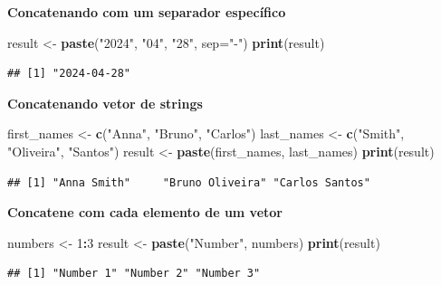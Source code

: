 \documentclass[
]{book}
\newenvironment{Shaded}{\begin{snugshade}}{\end{snugshade}}
\newcommand{\AttributeTok}[1]{\textcolor[rgb]{0.13,0.29,0.53}{#1}}
\newcommand{\DecValTok}[1]{\textcolor[rgb]{0.00,0.00,0.81}{#1}}
\newcommand{\FunctionTok}[1]{\textcolor[rgb]{0.13,0.29,0.53}{\textbf{#1}}}
\newcommand{\NormalTok}[1]{#1}
\newcommand{\OtherTok}[1]{\textcolor[rgb]{0.56,0.35,0.01}{#1}}
\newcommand{\SpecialCharTok}[1]{\textcolor[rgb]{0.81,0.36,0.00}{\textbf{#1}}}
\newcommand{\StringTok}[1]{\textcolor[rgb]{0.31,0.60,0.02}{#1}}
\begin{document}
\textbf{Concatenando com um separador específico}

\begin{Shaded}
\begin{Highlighting}[]
\NormalTok{result }\OtherTok{\textless{}{-}} \FunctionTok{paste}\NormalTok{(}\StringTok{"2024"}\NormalTok{, }\StringTok{"04"}\NormalTok{, }\StringTok{"28"}\NormalTok{, }\AttributeTok{sep=}\StringTok{"{-}"}\NormalTok{)}
\FunctionTok{print}\NormalTok{(result)}
\end{Highlighting}
\end{Shaded}

\begin{verbatim}
## [1] "2024-04-28"
\end{verbatim}

\textbf{Concatenando vetor de strings}

\begin{Shaded}
\begin{Highlighting}[]
\NormalTok{first\_names }\OtherTok{\textless{}{-}} \FunctionTok{c}\NormalTok{(}\StringTok{"Anna"}\NormalTok{, }\StringTok{"Bruno"}\NormalTok{, }\StringTok{"Carlos"}\NormalTok{)}
\NormalTok{last\_names }\OtherTok{\textless{}{-}} \FunctionTok{c}\NormalTok{(}\StringTok{"Smith"}\NormalTok{, }\StringTok{"Oliveira"}\NormalTok{, }\StringTok{"Santos"}\NormalTok{)}
\NormalTok{result }\OtherTok{\textless{}{-}} \FunctionTok{paste}\NormalTok{(first\_names, last\_names)}
\FunctionTok{print}\NormalTok{(result)}
\end{Highlighting}
\end{Shaded}

\begin{verbatim}
## [1] "Anna Smith"     "Bruno Oliveira" "Carlos Santos"
\end{verbatim}

\textbf{Concatene com cada elemento de um vetor}

\begin{Shaded}
\begin{Highlighting}[]
\NormalTok{numbers }\OtherTok{\textless{}{-}} \DecValTok{1}\SpecialCharTok{:}\DecValTok{3}
\NormalTok{result }\OtherTok{\textless{}{-}} \FunctionTok{paste}\NormalTok{(}\StringTok{"Number"}\NormalTok{, numbers)}
\FunctionTok{print}\NormalTok{(result)}
\end{Highlighting}
\end{Shaded}

\begin{verbatim}
## [1] "Number 1" "Number 2" "Number 3"
\end{verbatim}
\end{document}
